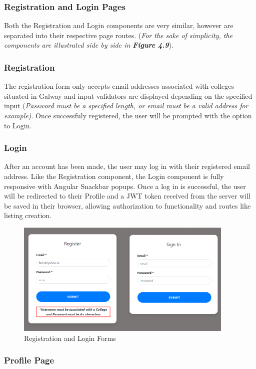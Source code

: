 \subsubsection{Registration and Login Pages}
Both the Registration and Login components are very similar, however are separated into their respective page routes. (\textit{For the sake of simplicity, the components are illustrated side by side in \textbf{Figure 4.9}}).

\subsubsection{Registration}
The registration form only accepts email addresses associated with colleges situated in Galway and input validators are displayed depending on the specified input (\textit{Password must be a specified length, or email must be a valid address for example)}. Once successfuly registered, the user will be prompted with the option to Login.

\subsubsection{Login}
After an account has been made, the user may log in with their registered email address. Like the Registration component, the Login component is fully responsive with Angular Snackbar popups. Once a log in is successful, the user will be redirected to their Profile and a JWT token received from the server will be saved in their browser, allowing authorization to functionality and routes like listing creation.

\begin{figure}[H]
	\caption{Registration and Login Forms}
	\label{image:login}
	\centering
	\includegraphics[width=0.93\textwidth]{images/login_reg.png}
\end{figure}

\subsubsection{Profile Page}

